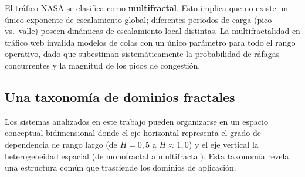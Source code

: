 El tráfico NASA se clasifica como \textbf{multifractal}. Esto implica que no
existe un único exponente de escalamiento global; diferentes periodos de carga
(pico vs.~valle) poseen dinámicas de escalamiento local distintas. La
multifractalidad en tráfico web invalida modelos de colas con un único parámetro
para todo el rango operativo, dado que subestiman sistemáticamente la
probabilidad de ráfagas concurrentes y la magnitud de los picos de congestión.

\subsection{Una taxonomía de dominios fractales}

Los sistemas analizados en este trabajo pueden organizarse en un espacio
conceptual bidimensional donde el eje horizontal representa el grado de
dependencia de rango largo (de $H=0{,}5$ a $H\approx1{,}0$) y el eje vertical
la heterogeneidad espacial (de monofractal a multifractal). Esta taxonomía
revela una estructura común que trasciende los dominios de aplicación.

